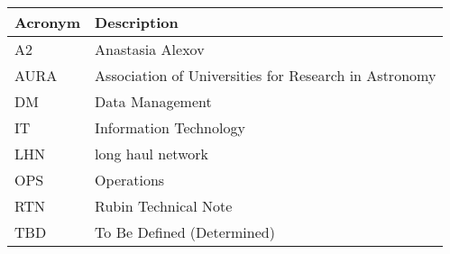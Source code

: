 \addtocounter{table}{-1}
\begin{longtable}{p{}p{}}\hline
\textbf{Acronym} & \textbf{Description}  \\\hline

A2 & Anastasia Alexov \\\hline
AURA & Association of Universities for Research in Astronomy \\\hline
DM & Data Management \\\hline
IT & Information Technology \\\hline
LHN & long haul network \\\hline
OPS & Operations \\\hline
RTN & Rubin Technical Note \\\hline
TBD & To Be Defined (Determined) \\\hline
\end{longtable}
